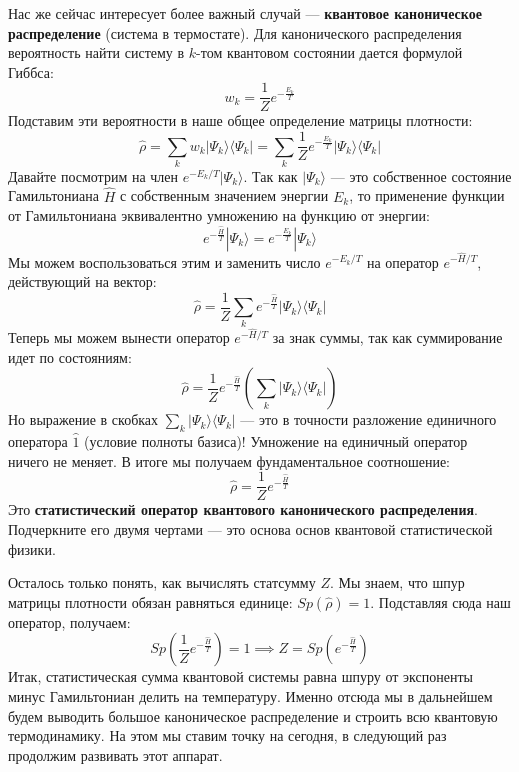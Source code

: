 \documentclass[../general/general]{subfiles}
\begin{document}
Нас же сейчас интересует более важный случай — \textbf{квантовое каноническое распределение} (система в термостате). Для канонического распределения вероятность найти систему в $k$-том квантовом состоянии дается формулой Гиббса:
\begin{equation}
    w_k = \frac{1}{Z} e^{-\frac{E_k}{T}}
\end{equation}
Подставим эти вероятности в наше общее определение матрицы плотности:
\begin{equation}
    \hat{\rho} = \sum_k w_k |\Psi_k\rangle \langle \Psi_k | = \sum_k \frac{1}{Z} e^{-\frac{E_k}{T}} |\Psi_k\rangle \langle \Psi_k |
\end{equation}
Давайте посмотрим на член $e^{-E_k/T} |\Psi_k\rangle$. Так как $|\Psi_k\rangle$ — это собственное состояние Гамильтониана $\hat{H}$ с собственным значением энергии $E_k$, то применение функции от Гамильтониана эквивалентно умножению на функцию от энергии:
\begin{equation}
    e^{-\frac{\hat{H}}{T}} |\Psi_k\rangle = e^{-\frac{E_k}{T}} |\Psi_k\rangle
\end{equation}
Мы можем воспользоваться этим и заменить число $e^{-E_k/T}$ на оператор $e^{-\hat{H}/T}$, действующий на вектор:
\begin{equation}
    \hat{\rho} = \frac{1}{Z} \sum_k e^{-\frac{\hat{H}}{T}} |\Psi_k\rangle \langle \Psi_k |
\end{equation}
Теперь мы можем вынести оператор $e^{-\hat{H}/T}$ за знак суммы, так как суммирование идет по состояниям:
\begin{equation}
    \hat{\rho} = \frac{1}{Z} e^{-\frac{\hat{H}}{T}} \left( \sum_k |\Psi_k\rangle \langle \Psi_k | \right)
\end{equation}
Но выражение в скобках $\sum_k |\Psi_k\rangle \langle \Psi_k |$ — это в точности разложение единичного оператора $\hat{1}$ (условие полноты базиса)! Умножение на единичный оператор ничего не меняет. В итоге мы получаем фундаментальное соотношение:
\begin{equation}
    \hat{\rho} = \frac{1}{Z} e^{-\frac{\hat{H}}{T}}
\end{equation}
Это \textbf{статистический оператор квантового канонического распределения}. Подчеркните его двумя чертами — это основа основ квантовой статистической физики.

Осталось только понять, как вычислять статсумму $Z$. Мы знаем, что шпур матрицы плотности обязан равняться единице: $Sp(\hat{\rho}) = 1$. Подставляя сюда наш оператор, получаем:
\begin{equation}
    Sp\left( \frac{1}{Z} e^{-\frac{\hat{H}}{T}} \right) = 1 \implies Z = Sp\left( e^{-\frac{\hat{H}}{T}} \right)
\end{equation}
Итак, статистическая сумма квантовой системы равна шпуру от экспоненты минус Гамильтониан делить на температуру. Именно отсюда мы в дальнейшем будем выводить большое каноническое распределение и строить всю квантовую термодинамику. На этом мы ставим точку на сегодня, в следующий раз продолжим развивать этот аппарат.
\end{document}
